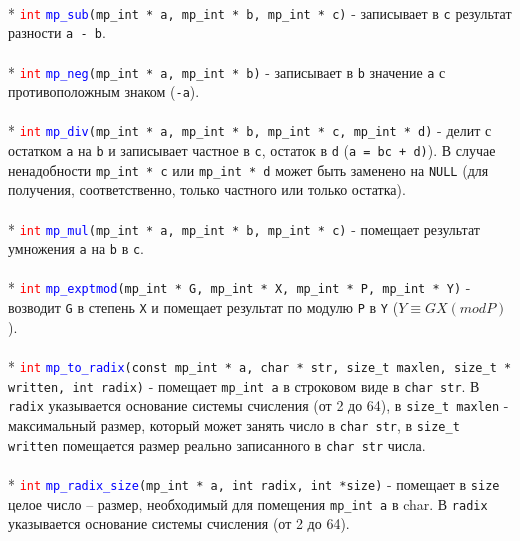 \documentclass[12pt]{article}
\begin{document}
\\*
\textcolor{red}{\texttt{int}} \textcolor{blue}{\texttt{mp\_sub}}\texttt{(mp\_int * a, mp\_int * b, mp\_int * c)} - записывает в \texttt{с} результат разности \texttt{a - b}.\\
\\*
\textcolor{red}{\texttt{int}} \textcolor{blue}{\texttt{mp\_neg}}\texttt{(mp\_int * a, mp\_int * b)} - записывает в \texttt{b} значение \texttt{a} с противоположным знаком (\texttt{-a}).\\
\\*
\textcolor{red}{\texttt{int}} \textcolor{blue}{\texttt{mp\_div}}\texttt{(mp\_int * a, mp\_int * b, mp\_int * c, mp\_int * d)} - делит с остатком \texttt{a} на \texttt{b} и записывает частное в \texttt{c}, остаток в \texttt{d} (\texttt{a = bc + d)}). В случае ненадобности \texttt{mp\_int * c} или \texttt{mp\_int * d} может быть заменено на \texttt{NULL} (для получения, соответственно, только частного или только остатка). \\
\\*
\textcolor{red}{\texttt{int}} \textcolor{blue}{\texttt{mp\_mul}}\texttt{(mp\_int * a, mp\_int * b, mp\_int * c)} - помещает результат умножения \texttt{a} на \texttt{b} в \texttt{c}.\\
\\*
\textcolor{red}{\texttt{int}} \textcolor{blue}{\texttt{mp\_exptmod}}\texttt{(mp\_int * G, mp\_int * X, mp\_int * P, mp\_int * Y)} - возводит \texttt{G} в степень \texttt{Х} и помещает результат по модулю \texttt{Р} в \texttt{Y} (\texttt{$Y \equiv G X (mod P)$}).\\
\\*
\textcolor{red}{\texttt{int}} \textcolor{blue}{\texttt{mp\_to\_radix}}\texttt{(const mp\_int * a, char * str, size\_t maxlen, size\_t * written, int radix)} - помещает \texttt{mp\_int a} в строковом виде в \texttt{char str}. В \texttt{radix} указывается основание системы счисления (от 2 до 64), в \texttt{size\_t maxlen} - максимальный размер, который может занять число в \texttt{char str}, в \texttt{size\_t written} помещается размер реально записанного в \texttt{char str} числа.\\
\\*
\textcolor{red}{\texttt{int}} \textcolor{blue}{\texttt{mp\_radix\_size}}\texttt{(mp\_int * a, int radix, int *size)} - помещает в \texttt{size} целое число – размер, необходимый для помещения \texttt{mp\_int а} в char. В \texttt{radix} указывается основание системы счисления (от 2 до 64). \\
\end{document}

